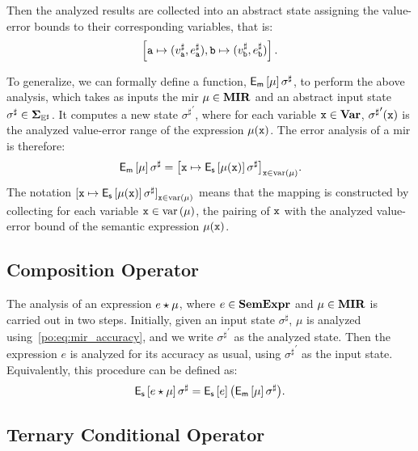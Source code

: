 Then the analyzed results are collected into an abstract state assigning the
value-error bounds to their corresponding variables, that is:
\begin{equation}
    \left[
        \texttt{a} \mapsto (v^\sharp_{\texttt{a}}, e^\sharp_{\texttt{a}}),
        \texttt{b} \mapsto (v^\sharp_{\texttt{b}}, e^\sharp_{\texttt{b}})
    \right].
\end{equation}

To generalize, we can formally define a function,
$\operatorname{\mathsf{E}_\mathsf{m}}\left[{\mu}\right]{\sigma^\sharp}$, to perform the above analysis,
which takes as inputs the \gls{mir} $\mu \in \mathbf{MIR}$ and an abstract
input state $\sigma^\sharp \in \mathbf{\Sigma}_{\mathbb{E}^\sharp}$.  It computes a new state
${\sigma^\sharp}^\prime$, where for each variable $\texttt{x} \in \mathbf{Var}$,
${\sigma^\sharp}^\prime(\texttt{x})$ is the analyzed value-error range of the
expression $\mu(\texttt{x})$.  The error analysis of a \gls{mir} is therefore:
\begin{equation}
    \operatorname{\mathsf{E}_\mathsf{m}}\left[{\mu}\right]{\sigma^\sharp} = {\left[
        \texttt{x} \mapsto \operatorname{\mathsf{E}_\mathsf{s}}\left[{\mu(\texttt{x})}\right]{\sigma^\sharp}
    \right]}_{\texttt{x} \in \mathrm{var}\left(\mu\right)}.
    \label{po:eq:mir_accuracy}
\end{equation}
The notation ${[\texttt{x} \mapsto
\operatorname{\mathsf{E}_\mathsf{s}}\left[{\mu(\texttt{x})}\right]{\sigma^\sharp}]}_{\texttt{x} \in \mathrm{var}\left(\mu\right)}$ means
that the mapping is constructed by collecting for each variable $\texttt{x} \in
\mathrm{var}\left(\mu\right)$, the pairing of $\texttt{x}$ with the analyzed value-error bound of the
semantic expression $\mu(\texttt{x})$.

\subsection{Composition Operator}

The analysis of an expression $e \mathbin{\star} \mu$, where $e \in \mathbf{SemExpr}$ and $\mu
\in \mathbf{MIR}$ is carried out in two steps.  Initially, given an input state
$\sigma^\sharp$, $\mu$ is analyzed using~\eqref{po:eq:mir_accuracy}, and we
write ${\sigma^\sharp}^\prime$ as the analyzed state.  Then the expression $e$
is analyzed for its accuracy as usual, using ${\sigma^\sharp}^\prime$ as the
input state.  Equivalently, this procedure can be defined as:
\begin{equation}
    \operatorname{\mathsf{E}_\mathsf{s}}\left[{e \mathbin{\star} \mu}\right]{\sigma^\sharp}
    = \operatorname{\mathsf{E}_\mathsf{s}}\left[{e}\right]{\left( \ensuremath{\operatorname{\mathsf{E}_\mathsf{m}}}\left[{\mu}\right]{\sigma^\sharp} \right)}.
\end{equation}

\subsection{Ternary Conditional Operator}

